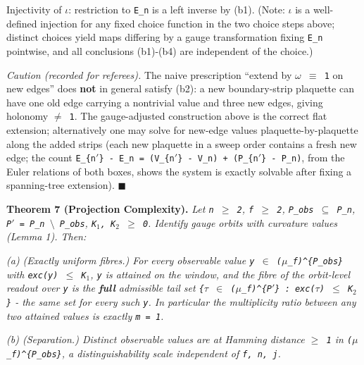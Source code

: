 \documentclass[
  american,
  11pt,
  letterpaper,
]{article}
\begin{document}
Injectivity of \texttt{\ensuremath{\iota}}: restriction to \texttt{E\_n} is a left inverse by (b1). (Note: \texttt{\ensuremath{\iota}} is a well-defined injection for any fixed choice function in the two choice steps above; distinct choices yield maps differing by a gauge transformation fixing \texttt{E\_n} pointwise, and all conclusions (b1)-(b4) are independent of the choice.)

\emph{Caution (recorded for referees).} The naive prescription ``extend by \texttt{\ensuremath{\omega}\ \ensuremath{\equiv}\ 1} on new edges'' does \textbf{not} in general satisfy (b2): a new boundary-strip plaquette can have one old edge carrying a nontrivial value and three new edges, giving holonomy \texttt{\ensuremath{\neq}\ 1}. The gauge-adjusted construction above is the correct flat extension; alternatively one may solve for new-edge values plaquette-by-plaquette along the added strips (each new plaquette in a sweep order contains a fresh new edge; the count \texttt{\textbar{}E\_\{n\ensuremath{'}\}\textbar{}\ -\ \textbar{}E\_n\textbar{}\ =\ (\textbar{}V\_\{n\ensuremath{'}\}\textbar{}\ -\ \textbar{}V\_n\textbar{})\ +\ (\textbar{}P\_\{n\ensuremath{'}\}\textbar{}\ -\ \textbar{}P\_n\textbar{})}, from the Euler relations of both boxes, shows the system is exactly solvable after fixing a spanning-tree extension). \ensuremath{\blacksquare}

\textbf{Theorem 7 (Projection Complexity).} \emph{Let \texttt{n\ \ensuremath{\geq}\ 2}, \texttt{f\ \ensuremath{\geq}\ 2}, \texttt{P\_obs\ \ensuremath{\subseteq}\ P\_n}, \texttt{P\ensuremath{'}\ =\ P\_n\ \ensuremath{\setminus}\ P\_obs}, \texttt{K\ensuremath{{}_{1}},\ K\ensuremath{{}_{2}}\ \ensuremath{\geq}\ 0}. Identify gauge orbits with curvature values (Lemma 1). Then:}

\emph{(a) (Exactly uniform fibres.) For every observable value \texttt{y\ \ensuremath{\in}\ (\ensuremath{\mu}\_f)\^{}\{P\_obs\}} with \texttt{exc(y)\ \ensuremath{\leq}\ K\ensuremath{{}_{1}}}, \texttt{y} is attained on the window, and the fibre of the orbit-level readout over \texttt{y} is the \textbf{full} admissible tail set \texttt{\{\ensuremath{\tau}\ \ensuremath{\in}\ (\ensuremath{\mu}\_f)\^{}\{P\ensuremath{'}\}\ :\ exc(\ensuremath{\tau})\ \ensuremath{\leq}\ K\ensuremath{{}_{2}}\}} - the same set for every such \texttt{y}. In particular the multiplicity ratio between any two attained values is exactly \texttt{m\ =\ 1}.}

\emph{(b) (Separation.) Distinct observable values are at Hamming distance \texttt{\ensuremath{\geq}\ 1} in \texttt{(\ensuremath{\mu}\_f)\^{}\{P\_obs\}}, a distinguishability scale independent of \texttt{f,\ n,\ j}.}
\end{document}
